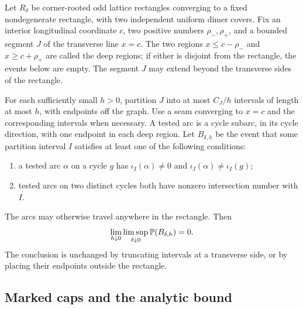 \begin{proposition}
\label{prop:rectangle-short}
Let $R_\delta$ be corner-rooted odd lattice rectangles converging to a
fixed nondegenerate rectangle, with two independent uniform dimer
covers.  Fix an interior longitudinal coordinate $c$, two positive
numbers $\rho_-,\rho_+$, and a bounded segment $J$ of the transverse line
$x=c$.  The two regions $x\le c-\rho_-$ and $x\ge c+\rho_+$ are called the
deep regions; if either is disjoint from the rectangle, the events below
are empty.  The segment $J$ may extend beyond the transverse sides of the
rectangle.

For each sufficiently small $h>0$, partition $J$ into at most $C_J/h$
intervals of length at most $h$, with endpoints off the graph.  Use a seam converging to $x=c$
and the corresponding intervals when necessary.  A tested arc is a
cycle subarc, in its cycle direction, with one endpoint in each deep
region.  Let $B_{\delta,h}$ be the event that some partition interval $I$
satisfies at least one of the following conditions:
\begin{enumerate}[label=\textnormal{(\roman*)}]
 \item a tested arc $\alpha$ on a cycle $g$ has
 $\iota_I(\alpha)\ne0$ and $\iota_I(\alpha)\ne\iota_I(g)$;
 \item tested arcs on two distinct cycles both have nonzero intersection
 number with $I$.
\end{enumerate}
The arcs may otherwise travel anywhere in the rectangle.  Then
\begin{equation}
 \lim_{h\downarrow0}\limsup_{\delta\downarrow0}
       \mathbb P(B_{\delta,h})=0.
 \label{eq:rectangle-short-limit}
\end{equation}
The conclusion is unchanged by truncating intervals at a transverse
side, or by placing their endpoints outside the rectangle.
\end{proposition}

\subsection{Marked caps and the analytic bound}

